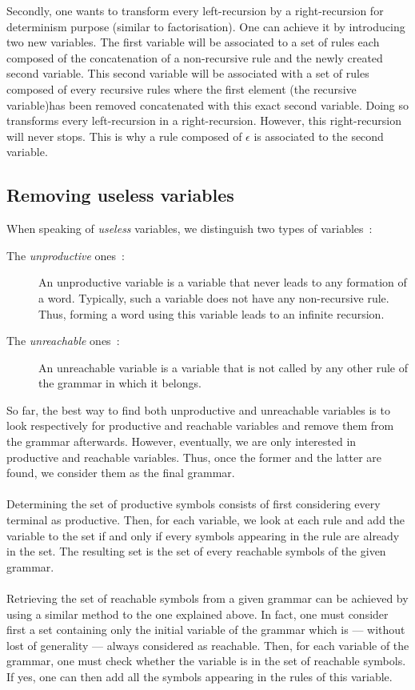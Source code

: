 \documentclass[a4paper,11pt]{article}
\begin{document}
  Secondly, one wants to transform every left-recursion by a right-recursion for determinism purpose (similar to factorisation). One can achieve it by introducing two new variables. The first variable will be associated to a set of rules each composed of the concatenation of a non-recursive rule and the newly created second variable. This second variable will be associated with a set of rules composed of every recursive rules where the first element (the recursive variable)has been removed concatenated with this exact second variable. Doing so transforms every left-recursion in a right-recursion. However, this right-recursion will never stops. This is why a rule composed of $\epsilon$ is associated to the second variable. %

  \subsection{Removing useless variables}
    \label{sec:useless}
    When speaking of \textit{useless} variables, we distinguish two types of variables~:
    \begin{description}
      \item[The \textit{unproductive} ones~:]
        An unproductive variable is a variable that never leads to any formation of a word. Typically, such a variable does not have any non-recursive rule. Thus, forming a word using this variable leads to an infinite recursion.
      \item[The \textit{unreachable} ones~:]
        An unreachable variable is a variable that is not called by any other rule of the grammar in which it belongs.
    \end{description}
    So far, the best way to find both unproductive and unreachable variables is to look respectively for productive and reachable variables and remove them from the grammar afterwards. However, eventually, we are only interested in productive and reachable variables. Thus, once the former and the latter are found, we consider them as the final grammar.\\\\
    Determining the set of productive symbols consists of first considering every terminal as productive. Then, for each variable, we look at each rule and add the variable to the set if and only if every symbols appearing in the rule are already in the set. The resulting set is the set of every reachable symbols of the given grammar.\\\\
    Retrieving the set of reachable symbols from a given grammar can be achieved by using a similar method to the one explained above. In fact, one must consider first a set containing only the initial variable of the grammar which is --- without lost of generality --- always considered as reachable. Then, for each variable of the grammar, one must check whether the variable is in the set of reachable symbols. If yes, one can then add all the symbols appearing in the rules of this variable.
    
\end{document}
